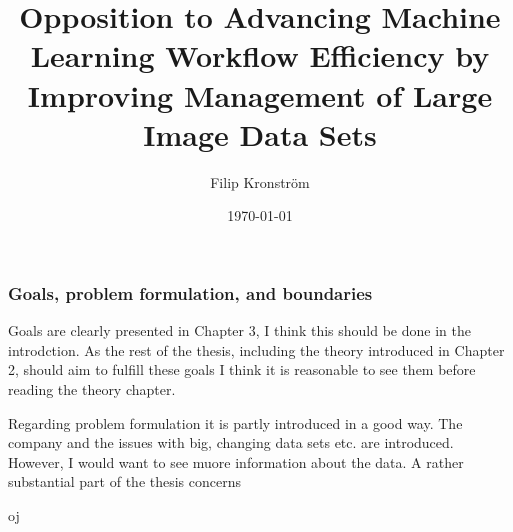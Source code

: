 \documentclass{article}
\title{Opposition to Advancing Machine Learning Workflow
Efficiency by Improving Management of
Large Image Data Sets}
\author{Filip Kronström}
\date{\today}
\begin{document}
  \maketitle

  \subsubsection*{Goals, problem formulation, and boundaries}
  Goals are clearly presented in Chapter 3, I think this should be done in the introdction. As the rest of the thesis, including the theory introduced in Chapter 2, should aim to fulfill these goals I think it is reasonable to see them before reading the theory chapter.

  Regarding problem formulation it is partly introduced in a good way. The company and the issues with big, changing data sets etc. are introduced. However, I would want to see muore information about the data. A rather substantial part of the thesis concerns


  oj
\end{document}
